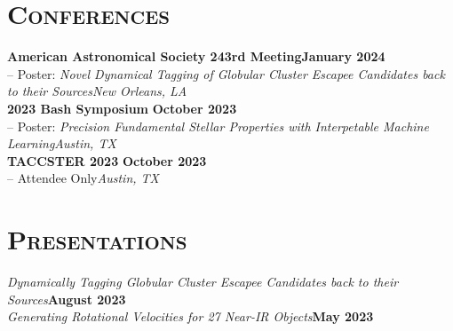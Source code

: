 \documentclass[11pt]{article}
\begin{document}
\section{\textsc{Conferences}}
\textbf{American Astronomical Society 243rd Meeting}\hfill\small\textbf{January 2024}
\\ -- Poster: \textit{Novel Dynamical Tagging of Globular Cluster Escapee Candidates back to their Sources\hfill New Orleans, LA}
\\\textbf{2023 Bash Symposium} \hfill\small\textbf{October 2023}
\\ -- Poster: \textit{Precision Fundamental Stellar Properties with Interpetable Machine Learning\hfill Austin, TX}
\\\textbf{TACCSTER 2023} \hfill\small\textbf{October 2023}
\\ -- Attendee Only\hfill\small\textit{Austin, TX}

\section{\textsc{Presentations}}
\textit{Dynamically Tagging Globular Cluster Escapee Candidates back to their Sources}\hfill\small\textbf{August 2023}
\\\textit{Generating Rotational Velocities for 27 Near-IR Objects}\hfill\small\textbf{May 2023}
\end{document}
